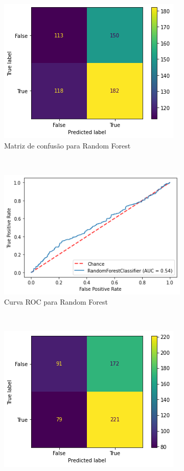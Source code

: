 \begin{figure}[htb] 
    \centering 
    \caption{Resultado tentativas de classificação para cada método aplicado sobre dados totais de CNAE}
    \label{fig:resultados:classification-total-nae} 
    \begin{subfigure}[b]{0.45\textwidth}
        \includegraphics[scale=0.45]{images/base-de-dados-28.4.1-confusion-matrix-randomforest-total-cnae.png}
        \caption{Matriz de confusão para Random Forest}
        \label{fig:resultadosbase-de-dados-28.3.1-confusion-matrix-randomforest-total-cnae}
    \end{subfigure} ~ \quad
    \begin{subfigure}[b]{0.45\textwidth}
        \includegraphics[scale=0.45]{images/base-de-dados-28.4.2-roc-curve-randomforest-total-cnae.png}
        \caption{Curva ROC para Random Forest}
        \label{fig:resultados:base-de-dados-28.3.2-roc-curve-randomforest-total-cnae}
    \end{subfigure} ~ \\
    \centering 
    \begin{subfigure}[b]{0.45\textwidth}
        \includegraphics[scale=0.45]{images/base-de-dados-28.4.3-confusion-matrix-svc-total-cnae.png}

\end{subfigure}
\end{figure}
